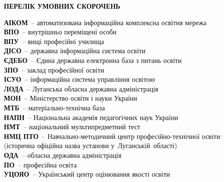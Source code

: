
\begin{center}
\textbf{\Large ПЕРЕЛІК УМОВНИХ СКОРОЧЕНЬ}
\end{center}

\vspace{0.5em}

\begin{flushleft}

\noindent\textbf{АІКОМ}~-- автоматизована інформаційна комплексна освітня мережа\\[2pt]
\noindent\textbf{ВПО}~-- внутрішньо переміщені особи\\[2pt]
\noindent\textbf{ВПУ}~-- вищі професійні училища\\[2pt]
\noindent\textbf{ДІСО}~-- державна інформаційна система освіти\\[2pt]
\noindent\textbf{ЄДЕБО}~-- Єдина державна електронна база з питань освіти\\[2pt]
\noindent\textbf{ЗПО}~-- заклад професійної освіти\\[2pt]
\noindent\textbf{ІСУО}~-- інформаційна система управління освітою\\[2pt]
\noindent\textbf{ЛОДА}~-- Луганська обласна державна адміністрація\\[2pt]
\noindent\textbf{МОН}~-- Міністерство освіти і науки України\\[2pt]
\noindent\textbf{МТБ}~-- матеріально-технічна база\\[2pt]
\noindent\textbf{НАПН}~-- Національна академія педагогічних наук України\\[2pt]
\noindent\textbf{НМТ}~-- національний мультипредметний тест\\[2pt]
\noindent\textbf{НМЦ ПТО}~-- Навчально-методичний центр професійно-технічної освіти (історична офіційна назва установи у~Луганській~області)\\[2pt]
\noindent\textbf{ОДА}~-- обласна державна адміністрація\\[2pt]
\noindent\textbf{ПО}~-- професійна освіта\\[2pt]
\noindent\textbf{УЦОЯО}~-- Український центр оцінювання якості освіти\\[2pt]


\end{flushleft}
